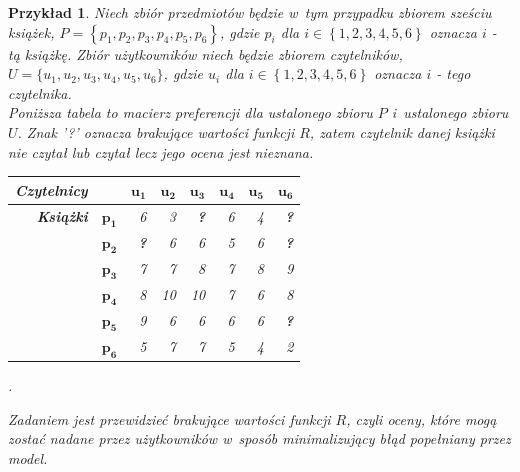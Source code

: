 \documentclass[12pt,a4paper]{report}
\newtheorem{przyklad}{Przykład}[chapter]{\normalfont}
\newcommand{\set}[1]{\left\lbrace {#1} \right\rbrace}
\newcommand{\setUzytkownicy}{\mathit{U}}
\newcommand{\setPrzedmioty}{\mathit{P}}
\begin{document}
\begin{przyklad}
Niech zbiór przedmiotów będzie w~tym przypadku zbiorem sześciu książek, $\setPrzedmioty = \set{p_1, p_2, p_3, p_4, p_5, p_6}$, gdzie $p_i$ dla $i \in \set{1,2,3,4,5,6}$ oznacza $i$ - tą książkę. Zbiór użytkowników niech będzie zbiorem czytelników, $\setUzytkownicy = \{u_1, u_2, u_3, u_4, u_5, u_6\}$, gdzie $u_i$ dla $i \in \set{1,2,3,4,5,6}$ oznacza $i$ - tego czytelnika.
\\Poniższa tabela to macierz preferencji dla ustalonego zbioru $\setPrzedmioty$ i~ustalonego zbioru $\setUzytkownicy$. Znak '?' oznacza brakujące wartości funkcji $R$, zatem czytelnik danej książki nie czytał lub czytał lecz jego ocena jest nieznana.
\begin{center}
\begin{tabular}{|r|r|r|r|r|r|r|r|} \hline
\textbf{Czytelnicy} & & $\mathbf{u_1}$ & $\mathbf{u_2}$ & $\mathbf{u_3}$ & $\mathbf{u_4}$ & $\mathbf{u_5}$ & $\mathbf{u_6}$ \\
\hline
\hline
\textbf{Książki} &$\mathbf{p_1}$ & 6 & 3 & \textbf{?} & 6 & 4 & \textbf{?} \\
\hline
&$\mathbf{p_2}$ & \textbf{?} & 6 & 6 & 5 & 6 & \textbf{?} \\
\hline
&$\mathbf{p_3}$ & 7 & 7 & 8 & 7 & 8 & 9  \\
\hline
&$\mathbf{p_4}$ & 8 & 10 & 10 & 7 & 6 & 8 \\
\hline
&$\mathbf{p_5}$ & 9 & 6 & 6 & 6 & 6 & \textbf{?} \\
\hline
&$\mathbf{p_6}$ & 5 & 7 & 7 & 5 & 4 & 2 \\
\hline
\end{tabular}.
\end{center}

Zadaniem jest przewidzieć brakujące wartości funkcji $R$, czyli oceny, które mogą zostać nadane przez użytkowników w~sposób minimalizujący błąd popełniany przez model.
\end{przyklad}
\end{document}
